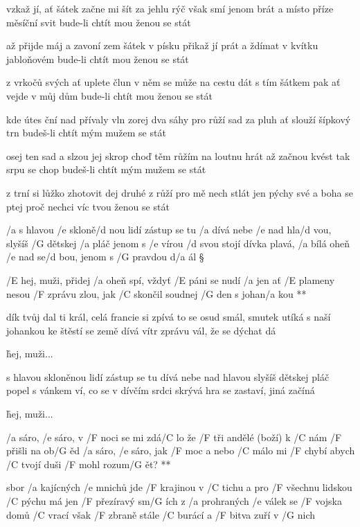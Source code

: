 vzkaž jí, ať šátek začne mi šít
za jehlu rýč však smí jenom brát
a místo příze měsíční svit
bude-li chtít mou ženou se stát \s

až přijde máj a zavoní zem
šátek v písku přikaž jí prát
a ždímat v kvítku jabloňovém
bude-li chtít mou ženou se stát \s

z vrkočů svých ať uplete člun
v něm se může na cestu dát
s tím šátkem pak ať vejde v můj dům
bude-li chtít mou ženou se stát \s

kde útes ční nad přívaly vln
zorej dva sáhy pro růží sad
za pluh ať slouží šípkový trn
budeš-li chtít mým mužem se stát \s

osej ten sad a slzou jej skrop
choď těm růžím na loutnu hrát
až začnou kvést tak srpu se chop
budeš-li chtít mým mužem se stát \s

z trní si lůžko zhotovit dej
druhé z růží pro mě nech stlát
jen pýchy své a boha se ptej
proč nechci víc tvou ženou se stát




/a s hlavou /e skloně/d nou lidí zástup se tu /a dívá
nebe /e nad hla/d vou, slyšíš /G dětskej /a pláč
jenom s /e vírou /d svou stojí dívka plavá, /a bílá
oheň /e nad se/d bou, jenom s /G pravdou d/a ál \S

\R /E hej, muži, přidej /a oheň spí, vždyť /E páni se nudí /a jen
   ať /E plameny nesou /F zprávu zlou, jak /C skončil
   soudnej /G den
   s johan/a kou **

dík tvůj dal ti král, celá francie si zpívá
to se osud smál, smutek utíká
s naší johankou ke štěstí se země dívá
vítr zprávu vál, že se dýchat dá \s

\r hej, muži...

s hlavou skloněnou lidí zástup se tu dívá
nebe nad hlavou slyšíš dětskej pláč
popel s vánkem ví, co se v dívčím srdci skrývá
hra se zastaví, jiná začíná \s

\r hej, muži...




\R /a sáro, /e sáro, v /F noci se mi zdá/C lo
   že /F tři andělé (boží) k /C nám /F přišli na ob/G ěd
   /a sáro, /e sáro, jak /F moc a nebo /C málo
   mi /F chybí abych /C tvojí duši /F mohl rozum/G ět? **

sbor /a kajícných /e mnichů jde /F krajinou v /C tichu
a pro /F všechnu lidskou /C pýchu má jen /F přezíravý sm/G ích
z /a prohraných /e válek se /F vojska domů /C vrací
však /F zbraně stále /C burácí a /F bitva zuří v /G nich

